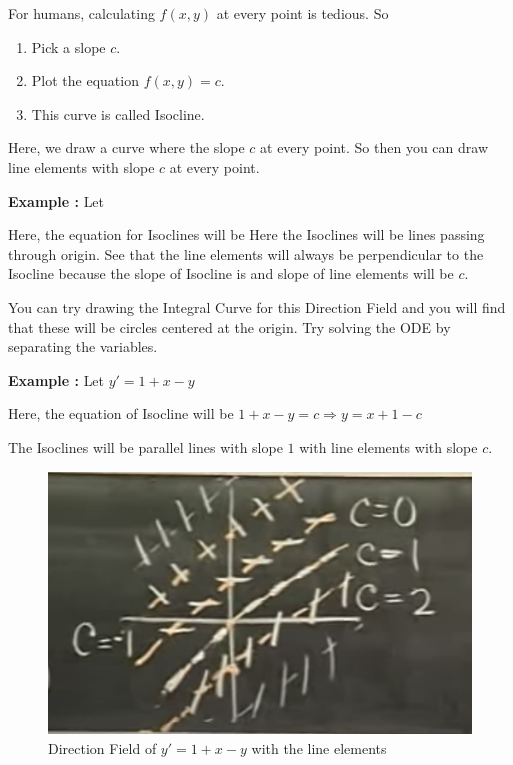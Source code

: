 For humans, calculating $f(x, y)$ at every point is tedious.
So 
\begin{enumerate}
    \item Pick a slope $c$.
    \item Plot the equation $f(x, y) = c$.
    \item This curve is called Isocline.
\end{enumerate}

Here, we draw a curve where the slope $c$ at every point. 
So then you can draw line elements with slope $c$ at every point.


{\bf Example : } Let 

Here, the equation for Isoclines will be 
Here the Isoclines will be lines passing through origin. 
See that the line elements will always be perpendicular to the Isocline because the slope of Isocline is  and slope of line elements will be $c$.

You can try drawing the Integral Curve for this Direction Field and you will find that these will be circles centered at the origin.
Try solving the ODE by separating the variables.

{\bf Example : } Let $y' = 1 + x - y$

Here, the equation of Isocline will be $1 + x - y = c \Rightarrow y = x + 1 - c$

The Isoclines will be parallel lines with slope $1$ with line elements with slope $c$.

\begin{figure}[ht!]
    \centering
    \includegraphics[scale=0.3]{./images/lecture_1_figure_2.png}
    \caption{Direction Field of $y' = 1 + x - y$ with the line elements}
\end{figure}


